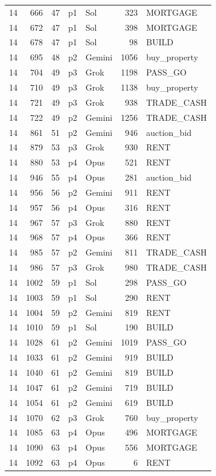 \begin{longtable}{r r r l l r >{\ttfamily}l}
14 & 666 & 47 & p1 & Sol & 323 & MORTGAGE \\
14 & 672 & 47 & p1 & Sol & 398 & MORTGAGE \\
14 & 678 & 47 & p1 & Sol & 98 & BUILD \\
14 & 695 & 48 & p2 & Gemini & 1056 & buy\_property \\
14 & 704 & 49 & p3 & Grok & 1198 & PASS\_GO \\
14 & 710 & 49 & p3 & Grok & 1138 & buy\_property \\
14 & 721 & 49 & p3 & Grok & 938 & TRADE\_CASH \\
14 & 722 & 49 & p2 & Gemini & 1256 & TRADE\_CASH \\
14 & 861 & 51 & p2 & Gemini & 946 & auction\_bid \\
14 & 879 & 53 & p3 & Grok & 930 & RENT \\
14 & 880 & 53 & p4 & Opus & 521 & RENT \\
14 & 946 & 55 & p4 & Opus & 281 & auction\_bid \\
14 & 956 & 56 & p2 & Gemini & 911 & RENT \\
14 & 957 & 56 & p4 & Opus & 316 & RENT \\
14 & 967 & 57 & p3 & Grok & 880 & RENT \\
14 & 968 & 57 & p4 & Opus & 366 & RENT \\
14 & 985 & 57 & p2 & Gemini & 811 & TRADE\_CASH \\
14 & 986 & 57 & p3 & Grok & 980 & TRADE\_CASH \\
14 & 1002 & 59 & p1 & Sol & 298 & PASS\_GO \\
14 & 1003 & 59 & p1 & Sol & 290 & RENT \\
14 & 1004 & 59 & p2 & Gemini & 819 & RENT \\
14 & 1010 & 59 & p1 & Sol & 190 & BUILD \\
14 & 1028 & 61 & p2 & Gemini & 1019 & PASS\_GO \\
14 & 1033 & 61 & p2 & Gemini & 919 & BUILD \\
14 & 1040 & 61 & p2 & Gemini & 819 & BUILD \\
14 & 1047 & 61 & p2 & Gemini & 719 & BUILD \\
14 & 1054 & 61 & p2 & Gemini & 619 & BUILD \\
14 & 1070 & 62 & p3 & Grok & 760 & buy\_property \\
14 & 1085 & 63 & p4 & Opus & 496 & MORTGAGE \\
14 & 1090 & 63 & p4 & Opus & 556 & MORTGAGE \\
14 & 1092 & 63 & p4 & Opus & 6 & RENT \\

\end{longtable}
